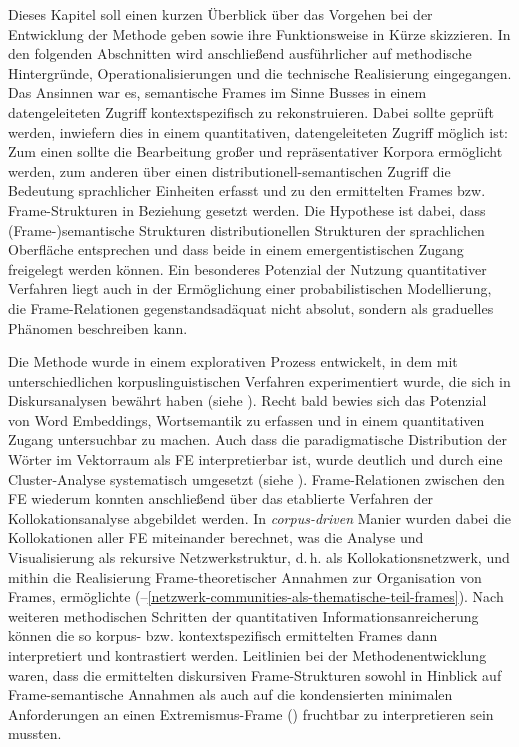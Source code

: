 Dieses Kapitel soll einen kurzen Überblick über das Vorgehen bei der Entwicklung der Methode geben sowie ihre Funktionsweise in Kürze skizzieren. In den folgenden Abschnitten wird anschließend ausführlicher auf methodische Hintergründe, Operationalisierungen und die technische Realisierung eingegangen. Das Ansinnen war es, semantische Frames im Sinne Busses \autocite*{busseFrameSemantikKompendium2012} in einem datengeleiteten Zugriff kontextspezifisch zu rekonstruieren. Dabei sollte geprüft werden, inwiefern dies in einem quantitativen, datengeleiteten Zugriff möglich ist: Zum einen sollte die Bearbeitung großer und repräsentativer Korpora ermöglicht werden, zum anderen über einen distributionell-semantischen Zugriff die Bedeutung sprachlicher Einheiten erfasst und zu den ermittelten Frames bzw. Frame-Strukturen in Beziehung gesetzt werden. Die Hypothese ist dabei, dass (Frame\mbox{-})semantische Strukturen distributionellen Strukturen der sprachlichen Oberfläche entsprechen und dass beide in einem emergentistischen Zugang freigelegt werden können. Ein besonderes Potenzial der Nutzung quantitativer Verfahren liegt auch in der Ermöglichung einer probabilistischen Modellierung, die Frame-Relationen gegenstandsadäquat nicht absolut, sondern als graduelles Phänomen beschreiben kann.

Die Methode wurde in einem explorativen Prozess entwickelt, in dem mit unterschiedlichen korpuslinguistischen Verfahren experimentiert wurde, die sich in Diskursanalysen bewährt haben (siehe ). Recht bald bewies sich das Potenzial von Word Embeddings, Wortsemantik zu erfassen und in einem quantitativen Zugang untersuchbar zu machen. Auch dass die paradigmatische Distribution der Wörter im Vektorraum als FE interpretierbar ist, wurde deutlich und durch eine Cluster-Analyse systematisch umgesetzt (siehe ). Frame-Relationen zwischen den FE wiederum konnten anschließend über das etablierte Verfahren der Kollokationsanalyse abgebildet werden. In \emph{corpus-driven} Manier wurden dabei die Kollokationen aller FE miteinander berechnet, was die Analyse und Visualisierung als rekursive Netzwerkstruktur, d.\,h. als Kollokationsnetzwerk, und mithin die Realisierung Frame-theoretischer Annahmen zur Organisation von Frames, ermöglichte (--\ref{netzwerk-communities-als-thematische-teil-frames}). Nach weiteren methodischen Schritten der quantitativen Informationsanreicherung können die so korpus- bzw. kontextspezifisch ermittelten Frames dann interpretiert und kontrastiert werden. Leitlinien bei der Methodenentwicklung waren, dass die ermittelten diskursiven Frame-Strukturen sowohl in Hinblick auf Frame-semantische Annahmen als auch auf die kondensierten minimalen Anforderungen an einen Extremismus-Frame () fruchtbar zu interpretieren sein mussten.

